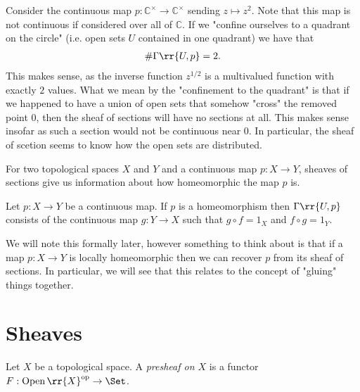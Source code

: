 \documentclass{article}
\begin{document}
\begin{example}
\label{ex:complexroot}
Consider the continuous map $p : \mathbb{C}^\times \to \mathbb{C}^\times$ sending $z \mapsto z^2$. Note that this map is not continuous if considered over all of $\mathbb{C}$. If we "confine ourselves to a quadrant on the circle" (i.e. open sets $U$ contained in one quadrant) we have that
\begin{align*}
	\# \Gamma\rr{U, p} = 2.
\end{align*}
This makes sense, as the inverse function $z^{1/2}$ is a multivalued function with exactly $2$ values. What we mean by the "confinement to the quadrant" is that if we happened to have a union of open sets that somehow "cross" the removed point $0$, then the sheaf of sections will have no sections at all. This makes sense insofar as such a section would not be continuous near $0$. In particular, the sheaf of scetion seems to know how the open sets are distributed.
\end{example}

\missingexample
{}


For two topological spaces $X$ and $Y$ and a continuous map $p : X \to Y$, sheaves of sections give us information about how homeomorphic the map $p$ is.

\begin{proposition}
Let $p : X \to Y$ be a continuous map. If $p$ is a homeomorphism then $\Gamma\rr{U,p}$ consists of the continuous map $g : Y \to X$ such that $g \circ f = 1_X$ and $f \circ g = 1_Y$. 
\end{proposition}

\begin{remark}
We will note this formally later, however something to think about is that if a map $p : X \to Y$ is locally homeomorphic then we can recover $p$ from its sheaf of sections. In particular, we will see that this relates to the concept of "gluing" things together.
\end{remark}

\section{Sheaves}\label{sec:sheaves}

\begin{definition}
  Let $X$ be a topological space. A \emph{presheaf on $X$} is a functor
  $F:\Open\rr{X}^{\text{op}}\to\Set$.
\end{definition}
\end{document}
